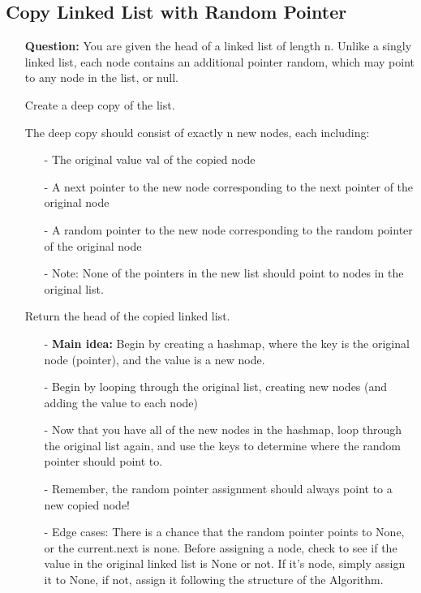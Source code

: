 \documentclass[12pt]{article}
\begin{document}
\subsection{Copy Linked List with Random Pointer}
\begin{enumerate}
  \item[] \textbf{Question:} You are given the head of a linked list of length n. Unlike a singly linked list, each node contains an additional pointer random, which may point to any node in the list, or null.

Create a deep copy of the list.

The deep copy should consist of exactly n new nodes, each including:

\begin{enumerate}
  \item[-] The original value val of the copied node
  \item[-] A next pointer to the new node corresponding to the next pointer of the original node
  \item[-] A random pointer to the new node corresponding to the random pointer of the original node
  \item[-] Note: None of the pointers in the new list should point to nodes in the original list.
\end{enumerate}

Return the head of the copied linked list.

    \begin{enumerate}
      \item[-] \textbf{Main idea:} Begin by creating a hashmap, where the key is the original node (pointer), and the value is a new node.
      \item[-] Begin by looping through the original list, creating new nodes (and adding the value to each node)
      \item[-] Now that you have all of the new nodes in the hashmap, loop through the original list again, and use the keys to determine where the random pointer should point to.  
      \item[-] Remember, the random pointer assignment should always point to a new copied node!
      \item[-] Edge cases: There is a chance that the random pointer points to None, or the current.next is none. Before assigning a node, check to see if the value in the original linked list is None or not. If it's node, simply assign it to None, if not, assign it following the structure of the Algorithm.

    \end{enumerate}
\end{enumerate}
\end{document}
